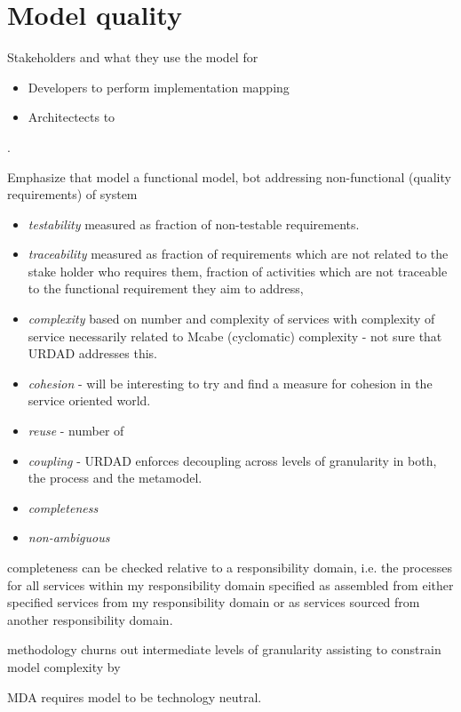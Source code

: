 \section{Model quality}

Stakeholders and what they use the model for
\begin{itemize}
  \item Developers to perform implementation mapping
  \item Architectects to 
\end{itemize}


\cite{lange_managing_2005,lange_improving_2006}.


Emphasize that model a functional model, bot addressing non-functional (quality requirements) of system

\begin{itemize}
  \item \emph{testability} measured as fraction of non-testable requirements.
  \item \emph{traceability} measured as fraction of requirements which are not related to the stake holder who requires them, fraction of activities which are not traceable to the functional requirement they aim to address, 
  \item \emph{complexity} based on number and complexity of services with complexity of service necessarily related to Mcabe (cyclomatic) complexity - not sure that URDAD addresses this.
  \item \emph{cohesion} - will be interesting to try and find a measure for cohesion in the service oriented world.
  \item \emph{reuse} - number of
  \item \emph{coupling} - URDAD enforces decoupling across levels of granularity in both, the process and the metamodel.
  \item \emph{completeness}
  \item \emph{non-ambiguous}
\end{itemize}


completeness can be checked relative to a responsibility domain, i.e. the processes for all services within my responsibility domain specified as assembled from either specified services from my responsibility domain or as services sourced from another responsibility domain.

methodology churns out intermediate levels of granularity assisting to constrain model complexity by 

MDA requires model to be technology neutral.

